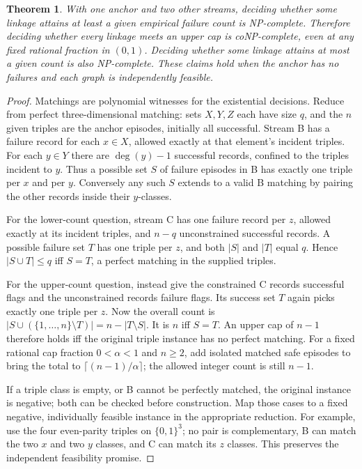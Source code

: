 \documentclass[11pt]{article}
\newtheorem{theorem}{Theorem}
\begin{document}
\begin{theorem}
With one anchor and two other streams, deciding whether some
linkage attains at least a given empirical failure count is
NP-complete. Therefore deciding whether every linkage meets an
upper cap is coNP-complete, even at any fixed rational fraction
in \((0,1)\). Deciding whether some linkage attains at most
a given count is also NP-complete. These claims hold when the
anchor has no failures and each graph is independently feasible.
\end{theorem}
\begin{proof}
Matchings are polynomial witnesses for the existential decisions.
Reduce from perfect three-dimensional matching: sets \(X,Y,Z\)
each have size \(q\), and the \(n\) given triples are the anchor
episodes, initially all successful. Stream B has a failure
record for each \(x\in X\), allowed exactly at that element's
incident triples. For each \(y\in Y\) there are
\(\deg(y)-1\) successful records, confined to the triples
incident to \(y\). Thus a possible set \(S\) of failure episodes
in B has exactly one triple per \(x\) and per \(y\).
Conversely any such \(S\) extends to a valid B matching by pairing
the other records inside their \(y\)-classes.

For the lower-count question, stream C has one failure record
per \(z\), allowed exactly at its incident triples, and \(n-q\)
unconstrained successful records. A possible failure set \(T\)
has one triple per \(z\), and both \(|S|\) and \(|T|\) equal \(q\).
Hence \(|S\cup T|\le q\) iff \(S=T\), a perfect matching in
the supplied triples.

For the upper-count question, instead give the constrained C
records successful flags and the unconstrained records failure
flags. Its success set \(T\) again picks exactly one triple per
\(z\). Now the overall count is
\(|S\cup(\{1,\ldots,n\}\setminus T)|=n-|T\setminus S|\).
It is \(n\) iff \(S=T\). An upper cap of \(n-1\) therefore
holds iff the original triple instance has no perfect matching.
For a fixed rational cap fraction \(0<\alpha<1\) and \(n\ge2\),
add isolated matched safe episodes to bring the total to
\(\lceil(n-1)/\alpha\rceil\); the allowed integer count is
still \(n-1\).

If a triple class is empty, or B cannot be perfectly matched,
the original instance is negative; both can be checked before
construction. Map those cases to a fixed negative, individually
feasible instance in the appropriate reduction. For example,
use the four even-parity triples on \(\{0,1\}^3\); no pair is
complementary, B can match the two \(x\) and two \(y\) classes,
and C can match its \(z\) classes. This preserves the independent
feasibility promise.
\end{proof}
\end{document}
